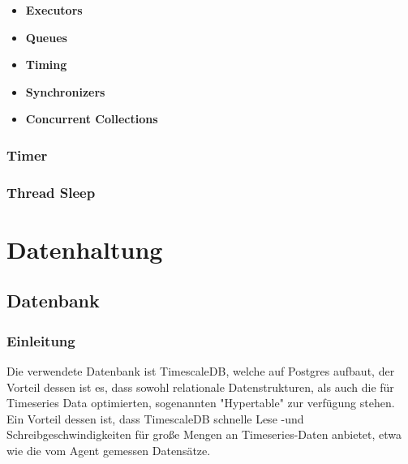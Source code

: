 \documentclass{report}
\begin{document}
\begin{itemize}
    \item \textbf{Executors}
        \begin{description}
            \item \noindent 
        \end{description}
    \item \textbf{Queues}
        \begin{description}
            \item \noindent 
        \end{description}
    \item \textbf{Timing}
        \begin{description}
            \item \noindent 
        \end{description}
    \item \textbf{Synchronizers}
        \begin{description}
            \item \noindent 
        \end{description}
    \item \textbf{Concurrent Collections}
        \begin{description}
            \item \noindent 
        \end{description}
\end{itemize}
\subsubsection{Timer}
\subsubsection{Thread Sleep}

\section{Datenhaltung}
\subsection{Datenbank}
\subsubsection{Einleitung}
Die verwendete Datenbank ist TimescaleDB, welche auf Postgres aufbaut, der Vorteil dessen ist es, dass sowohl relationale Datenstrukturen, als auch die für Timeseries Data optimierten, sogenannten "Hypertable" zur verfügung stehen. Ein Vorteil dessen ist, dass TimescaleDB schnelle Lese -und Schreibgeschwindigkeiten für große Mengen an Timeseries-Daten anbietet, etwa wie die vom Agent gemessen Datensätze.
\end{document}
